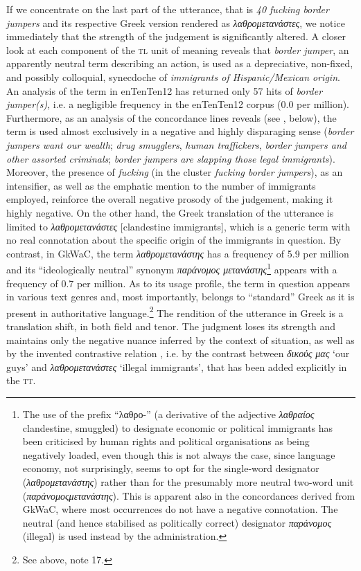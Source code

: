 \documentclass[output=paper]{LSP/langsci}
\begin{document}
If we concentrate on the last part of the utterance, that is \textit{40 fucking border jumpers} and its respective Greek version rendered as\textit{ λαθρομετανάστες}, we notice immediately that the strength of the judgement is significantly altered. A closer look at each component of the \textsc{tl} unit of meaning reveals that \textit{border jumper}, an apparently neutral term describing an action, is used as a depreciative, non-fixed, and possibly colloquial, synecdoche of \textit{immigrants of Hispanic/Mexican origin}. An analysis of the term in enTenTen12 has returned only 57 hits of \textit{border jumper(s)}, i.e. a negligible frequency in the enTenTen12 corpus (0.0 per million). Furthermore, as an analysis of the concordance lines reveals (see , below), the term is used almost exclusively in a negative and highly disparaging sense (\textit{border jumpers want our wealth}; \textit{drug smugglers}, \textit{human traffickers}, \textit{border jumpers and other assorted criminals}; \textit{border jumpers are slapping those legal immigrants}). Moreover, the presence of \textit{fucking} (in the cluster \textit{fucking border jumpers}), as an intensifier, as well as the emphatic mention to the number of immigrants employed, reinforce the overall negative prosody of the judgement, making it highly negative. On the other hand, the Greek translation of the utterance is limited to \textit{λαθρομετανάστες} [clandestine immigrants], which is a generic term with no real connotation about the specific origin of the immigrants in question. By contrast, in GkWaC, the term \textit{λαθρομετανάστης} has a frequency of 5.9 per million and its “ideologically neutral” synonym \textit{παράνομος μετανάστης}\footnote{The use of the prefix “λαθρο-” (a derivative of the adjective \textit{λαθραίος} {clandestine, smuggled}) to designate economic or political immigrants has been criticised by human rights and political organisations as being negatively loaded, even though this is not always the case, since language economy, not surprisingly, seems to opt for the single-word designator (\textit{λαθρομετανάστης}) rather than for the presumably more neutral two-word unit (\textit{παράνομοςμετανάστης}). This is apparent also in the concordances derived from GkWaC, where most occurrences do not have a negative connotation. The neutral (and hence stabilised as politically correct) designator \textit{παράνομος} (illegal) is used instead by the administration.} appears with a frequency of 0.7 per million. As to its usage profile, the term in question appears in various text genres and, most importantly, belongs to “standard” Greek as it is present in authoritative language.\footnote{See above, note 17.} The rendition of the utterance in Greek is a translation shift, in both field and tenor. The judgment loses its strength and maintains only the negative nuance inferred by the context of situation, as well as by the invented contrastive relation \citep[87--89]{Fairclough2003}, i.e. by the contrast between \textit{δικούς μας} `our guys' and \textit{λαθρομετανάστες} `illegal immigrants', that has been added explicitly in the \textsc{tt}.
\end{document}

